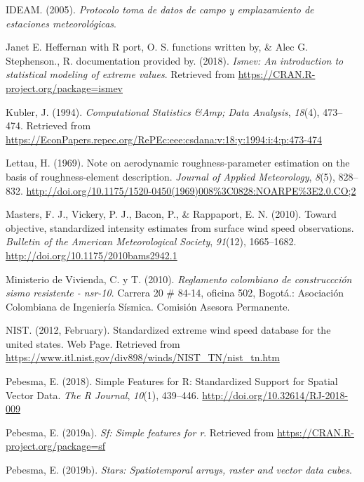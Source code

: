 \documentclass[12pt,oneside]{reedthesis}
\begin{document}
\leavevmode\hypertarget{ref-ideam2005}{}%
IDEAM. (2005). \emph{Protocolo toma de datos de campo y emplazamiento de estaciones meteorológicas}.

\leavevmode\hypertarget{ref-JanetE.HeffernanwithRport2018}{}%
Janet E. Heffernan with R port, O. S. functions written by, \& Alec G. Stephenson., R. documentation provided by. (2018). \emph{Ismev: An introduction to statistical modeling of extreme values}. Retrieved from \url{https://CRAN.R-project.org/package=ismev}

\leavevmode\hypertarget{ref-Kubler1994}{}%
Kubler, J. (1994). \emph{Computational Statistics \&Amp; Data Analysis}, \emph{18}(4), 473--474. Retrieved from \url{https://EconPapers.repec.org/RePEc:eee:csdana:v:18:y:1994:i:4:p:473-474}

\leavevmode\hypertarget{ref-Lettau1969}{}%
Lettau, H. (1969). Note on aerodynamic roughness-parameter estimation on the basis of roughness-element description. \emph{Journal of Applied Meteorology}, \emph{8}(5), 828--832. \url{http://doi.org/10.1175/1520-0450(1969)008\%3C0828:NOARPE\%3E2.0.CO;2}

\leavevmode\hypertarget{ref-Masters2010}{}%
Masters, F. J., Vickery, P. J., Bacon, P., \& Rappaport, E. N. (2010). Toward objective, standardized intensity estimates from surface wind speed observations. \emph{Bulletin of the American Meteorological Society}, \emph{91}(12), 1665--1682. \url{http://doi.org/10.1175/2010bams2942.1}

\leavevmode\hypertarget{ref-nsr10}{}%
Ministerio de Vivienda, C. y T. (2010). \emph{Reglamento colombiano de construccción sismo resistente - nsr-10}. Carrera 20 \# 84-14, oficina 502, Bogotá.: Asociación Colombiana de Ingeniería Sísmica. Comisión Asesora Permanente.

\leavevmode\hypertarget{ref-nist2012}{}%
NIST. (2012, February). Standardized extreme wind speed database for the united states. Web Page. Retrieved from \url{https://www.itl.nist.gov/div898/winds/NIST_TN/nist_tn.htm}

\leavevmode\hypertarget{ref-Pebesma2018}{}%
Pebesma, E. (2018). Simple Features for R: Standardized Support for Spatial Vector Data. \emph{The R Journal}, \emph{10}(1), 439--446. \url{http://doi.org/10.32614/RJ-2018-009}

\leavevmode\hypertarget{ref-Pebesma2019a}{}%
Pebesma, E. (2019a). \emph{Sf: Simple features for r}. Retrieved from \url{https://CRAN.R-project.org/package=sf}

\leavevmode\hypertarget{ref-Pebesma2019b}{}%
Pebesma, E. (2019b). \emph{Stars: Spatiotemporal arrays, raster and vector data cubes}.
\end{document}
